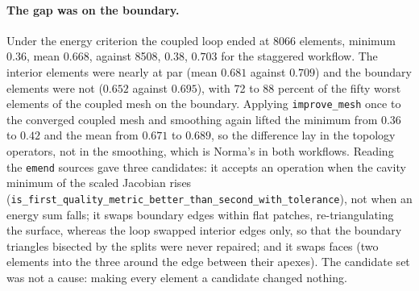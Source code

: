 \documentclass[11pt]{article}
\newcommand{\code}[1]{\texttt{#1}}
\begin{document}
\paragraph{The gap was on the boundary.} Under the energy criterion the
coupled loop ended at 8066 elements, minimum $0.36$, mean $0.668$,
against 8508, $0.38$, $0.703$ for the staggered workflow. The interior
elements were nearly at par (mean $0.681$ against $0.709$) and the
boundary elements were not ($0.652$ against $0.695$), with 72 to 88
percent of the fifty worst elements of the coupled mesh on the boundary.
Applying \code{improve\_mesh} once to the converged coupled mesh and
smoothing again lifted the minimum from $0.36$ to $0.42$ and the mean
from $0.671$ to $0.689$, so the difference lay in the topology operators,
not in the smoothing, which is Norma's in both workflows. Reading the
\code{emend} sources gave three candidates: it accepts an operation when
the cavity minimum of the scaled Jacobian rises
(\code{is\_first\_quality\_metric\_better\_than\_second\_with\_tolerance}),
not when an energy sum falls; it swaps boundary edges within flat
patches, re-triangulating the surface, whereas the loop swapped interior
edges only, so that the boundary triangles bisected by the splits were
never repaired; and it swaps faces (two elements into the three around the
edge between their apexes). The candidate set was not a cause: making
every element a candidate changed nothing.
\end{document}
